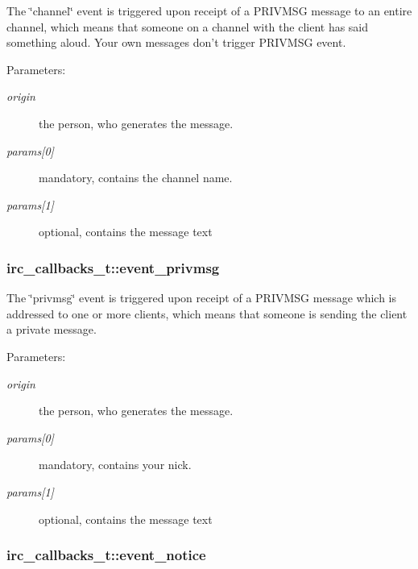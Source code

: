 The \char`\"{}channel\char`\"{} event is triggered upon receipt of a PRIVMSG message to an entire channel, which means that someone on a channel with the client has said something aloud. Your own messages don't trigger PRIVMSG event.

\begin{Desc}
\item[Parameters:]
\begin{description}
\item[{\em origin}]the person, who generates the message. \item[{\em params\mbox{[}0\mbox{]}}]mandatory, contains the channel name. \item[{\em params\mbox{[}1\mbox{]}}]optional, contains the message text \end{description}
\end{Desc}
\hypertarget{structirc__callbacks__t_f0fe4e42f9d675f0d844fc3c58b2dc5d}{
\subsubsection[event\_\-privmsg]{ {\bf irc\_\-callbacks\_\-t::event\_\-privmsg}}}
\label{structirc__callbacks__t_f0fe4e42f9d675f0d844fc3c58b2dc5d}


The \char`\"{}privmsg\char`\"{} event is triggered upon receipt of a PRIVMSG message which is addressed to one or more clients, which means that someone is sending the client a private message.

\begin{Desc}
\item[Parameters:]
\begin{description}
\item[{\em origin}]the person, who generates the message. \item[{\em params\mbox{[}0\mbox{]}}]mandatory, contains your nick. \item[{\em params\mbox{[}1\mbox{]}}]optional, contains the message text \end{description}
\end{Desc}
\hypertarget{structirc__callbacks__t_92a5b22ba900f06fa04ea9e79462ffc6}{
\subsubsection[event\_\-notice]{ {\bf irc\_\-callbacks\_\-t::event\_\-notice}}}
\label{structirc__callbacks__t_92a5b22ba900f06fa04ea9e79462ffc6}


